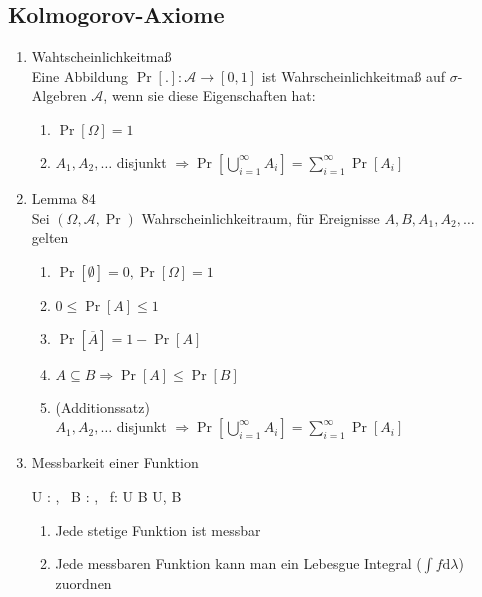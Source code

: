\documentclass[landscape, 8pt]{extarticle}
\newcommand{\Rarr}{\Rightarrow}
\newcommand{\Lrarr}{\Leftrightarrow}
\newcommand{\rarr}{\rightarrow}
\newcommand{\R}{\mathbb{R}}
\newcommand{\A}{\mathcal{A}}
\newcommand{\intd}{\text{d}}
\begin{document}
\begin{multicols*}{3}
\subsection{Kolmogorov-Axiome}
\begin{enumerate}
\item{Wahtscheinlichkeitmaß\\
Eine Abbildung $\Pr[.] : \A \rarr [0,1]$ ist Wahrscheinlichkeitmaß auf $\sigma$-Algebren $\A$, wenn sie diese Eigenschaften hat:
\begin{enumerate}[label= W\arabic*)]
\item{
$\Pr[\Omega] = 1$
}
\item {
$A_1,A_2,\dots$ disjunkt $\Rarr \Pr\left[\bigcup_{i=1}^\infty A_i\right] = \sum_{i = 1}^\infty \Pr[A_i]$
}
\end{enumerate}
}
\item {Lemma 84\\
Sei $(\Omega, \A, \Pr)$ Wahrscheinlichkeitraum, für Ereignisse $A, B, A_1, A_2, \dots$ gelten
\begin{enumerate}[label = \alph*)]
\item {
$\Pr[\emptyset] = 0, \Pr[\Omega] = 1$
}
\item{
$0 \leq \Pr[A] \leq 1$
}
\item{
$\Pr[\overline{A}] = 1 - \Pr[A]$
}
\item{
$A \subseteq B \Rarr \Pr[A] \leq \Pr[B]$
}
\item{(Additionssatz) \\
$A_1,A_2,\dots$ disjunkt $\Rarr \Pr\left[\bigcup_{i=1}^\infty A_i\right] = \sum_{i = 1}^\infty \Pr[A_i]$
}
\end{enumerate}
}
\item {Messbarkeit einer Funktion
\begin{myeq}
U : \R, ~B : \R, ~f: U \rarr B  \Lrarr U, B~ 
\end{myeq}
\begin{enumerate}[label = \alph*)]
\item {Jede stetige Funktion ist messbar}
\item {Jede messbaren Funktion kann man ein Lebesgue Integral ($\int f \intd \lambda$) zuordnen}
\end{enumerate}
}
\end{enumerate}


\end{multicols*}
\end{document}
